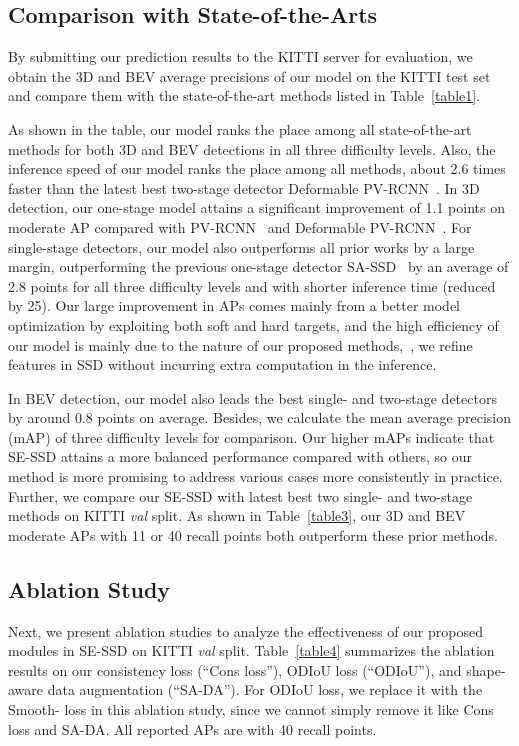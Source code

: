 \documentclass[letterpaper]{article}
\begin{document}
\subsection{Comparison with State-of-the-Arts}
By submitting our prediction results to the KITTI server for evaluation, we obtain the 3D and BEV average precisions of our model on the KITTI test set and compare them with the state-of-the-art methods listed in Table~\ref{table1}.

As shown in the table, our model ranks the  place among all state-of-the-art methods for both 3D and BEV detections in all three difficulty levels.
Also, the inference speed of our model ranks the  place among all methods, about 2.6 times faster than the latest best two-stage detector Deformable PV-RCNN~\cite{2020deformable}.
In 3D detection, our one-stage model attains a significant improvement of 1.1 points on moderate AP compared with PV-RCNN~\cite{2020deformable} and Deformable PV-RCNN~\cite{shi2020pv}.
For single-stage detectors, our model also outperforms all prior works by a large margin, outperforming the previous one-stage detector SA-SSD~\cite{he2020structure} by an average of 2.8 points for all three difficulty levels and with shorter inference time (reduced by 25).
Our large improvement in APs comes mainly from a better model optimization by exploiting both soft and hard targets, and the high efficiency of our model is mainly due to the nature of our proposed methods,~\ie, we refine features in SSD without incurring extra computation in the inference.

In BEV detection, our model also leads the best single- and two-stage detectors by around 0.8 points on average.
Besides, we calculate the mean average precision (mAP) of three difficulty levels for comparison.
Our higher mAPs indicate that SE-SSD attains a more balanced performance compared with others, so our method is more promising to address various cases more consistently in practice.
Further, we compare our SE-SSD with latest best two single- and two-stage methods on KITTI \textit{val} split.
As shown in Table~\ref{table3}, our 3D and BEV moderate APs with 11 or 40 recall points both outperform these prior methods.




\subsection{Ablation Study}
Next, we present ablation studies to analyze the effectiveness of our proposed modules in SE-SSD on KITTI \textit{val} split.
Table~\ref{table4} summarizes the ablation results on our consistency loss (``Cons loss''), ODIoU loss (``ODIoU''), and shape-aware data augmentation (``SA-DA'').
For ODIoU loss, we replace it with the Smooth- loss in this ablation study, since we cannot simply remove it like Cons loss and SA-DA.
All reported APs are with 40 recall points.
\end{document}
